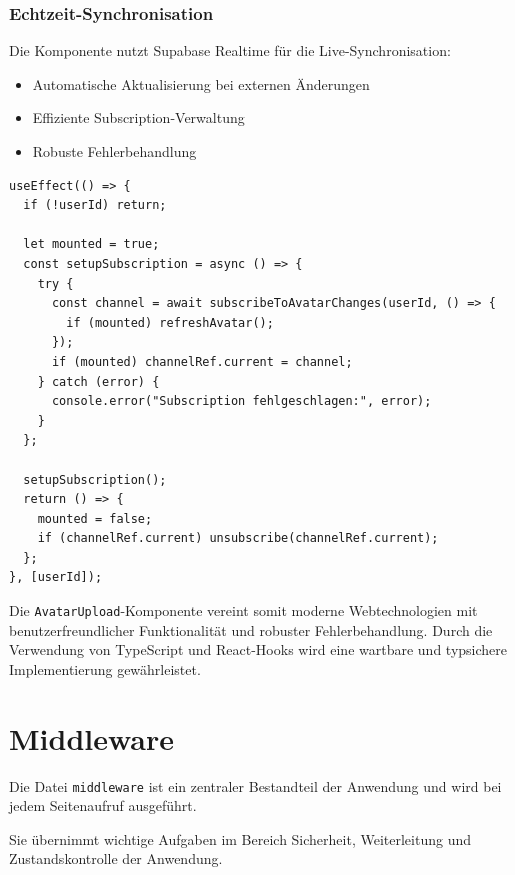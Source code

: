 \begin{inhalt}
\subsubsection{Echtzeit-Synchronisation}
Die Komponente nutzt Supabase Realtime für die Live-Synchronisation:
\begin{itemize}
    \item Automatische Aktualisierung bei externen Änderungen
    \item Effiziente Subscription-Verwaltung
    \item Robuste Fehlerbehandlung
\end{itemize}

\begin{lstlisting}[style=mytsx, caption={Implementierung der Echtzeit-Synchronisation}, label={lst:avatar_subscription}]
useEffect(() => {
  if (!userId) return;
  
  let mounted = true;
  const setupSubscription = async () => {
    try {
      const channel = await subscribeToAvatarChanges(userId, () => {
        if (mounted) refreshAvatar();
      });
      if (mounted) channelRef.current = channel;
    } catch (error) {
      console.error("Subscription fehlgeschlagen:", error);
    }
  };

  setupSubscription();
  return () => {
    mounted = false;
    if (channelRef.current) unsubscribe(channelRef.current);
  };
}, [userId]);
\end{lstlisting}

Die \texttt{AvatarUpload}-Komponente vereint somit moderne Webtechnologien mit benutzerfreundlicher Funktionalität und robuster Fehlerbehandlung. Durch die Verwendung von TypeScript und React-Hooks wird eine wartbare und typsichere Implementierung gewährleistet.







\newpage

\section{Middleware}
\label{ref:middelware}

Die Datei \texttt{middleware} ist ein zentraler Bestandteil der Anwendung und wird bei jedem Seitenaufruf ausgeführt.  
\vspace{0.15cm}

Sie übernimmt wichtige Aufgaben im Bereich Sicherheit, Weiterleitung und Zustandskontrolle der Anwendung.  


\end{inhalt}

